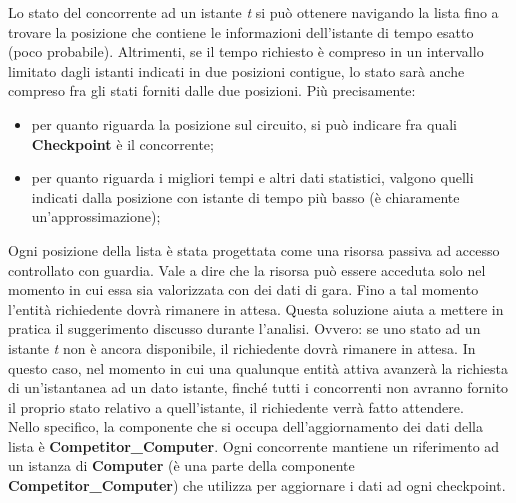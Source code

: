      Lo stato del concorrente ad un istante \emph{t} si può ottenere navigando
la lista fino a trovare la posizione che contiene le informazioni
     dell'istante di tempo esatto (poco probabile). Altrimenti, se il tempo
richiesto è compreso in un intervallo limitato dagli istanti
     indicati in due posizioni contigue, lo stato sarà anche compreso fra gli
stati forniti dalle due posizioni. Più precisamente:\\
     \begin{itemize}
     \item per quanto riguarda la posizione sul circuito, si può indicare fra
quali \textbf{Checkpoint} è il concorrente;
     \item per quanto riguarda i migliori tempi e altri dati statistici, valgono
quelli indicati dalla posizione con istante di tempo più basso (è chiaramente
     un'approssimazione);
     \end{itemize}
     Ogni posizione della lista è stata progettata come una risorsa passiva ad
accesso controllato con guardia. Vale a dire che la risorsa può
     essere acceduta solo nel momento in cui essa sia valorizzata con dei dati
di gara. Fino a tal momento l'entità richiedente dovrà rimanere
     in attesa. Questa soluzione aiuta a mettere in pratica il suggerimento
discusso durante l'analisi. Ovvero: se uno stato ad un istante
     \emph{t} non è ancora disponibile, il richiedente dovrà rimanere in attesa.
In questo caso, nel momento in cui una qualunque entità attiva
     avanzerà la richiesta di un'istantanea ad un dato istante, finché tutti i
concorrenti non avranno fornito il proprio stato relativo 
     a quell'istante, il richiedente verrà fatto attendere.\\
     Nello specifico, la componente che si occupa dell'aggiornamento dei dati
della lista è \textbf{Competitor\_Computer}. Ogni concorrente
     mantiene un riferimento ad un istanza di \textbf{Computer} (è una parte
della componente \textbf{Competitor\_Computer}) 
     che utilizza per aggiornare i dati ad ogni checkpoint.
